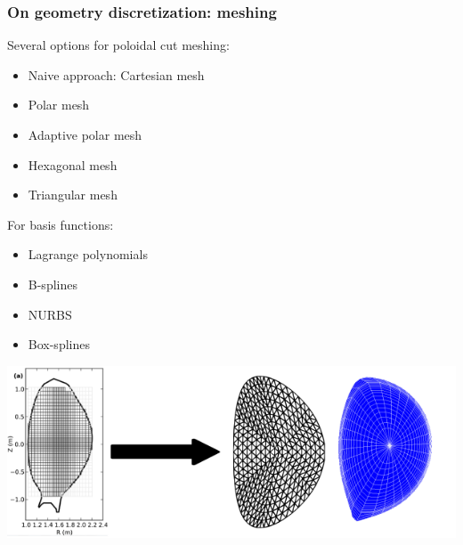 \documentclass[10pt]{beamer}
\begin{document}
\begin{frame}
\frametitle{On geometry discretization: meshing}


Several options for poloidal cut meshing:

\begin{itemize}
	\item Naive approach: Cartesian mesh
	\item Polar mesh
	\item Adaptive polar mesh
	\item Hexagonal mesh
	\item Triangular mesh
\end{itemize}


For basis functions:

\begin{itemize}
	\item Lagrange polynomials
	\item B-splines
	\item NURBS
	\item Box-splines
\end{itemize}


\vspace{-1.5cm}

\begin{flushright}
    	\includegraphics[width=0.7\linewidth]{figures/meshes.png}
\end{flushright}
\end{frame}
\end{document}
